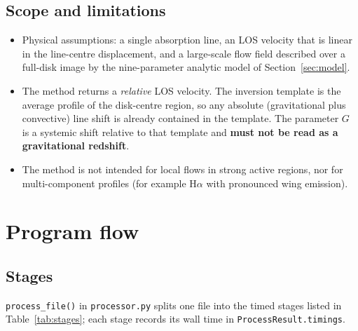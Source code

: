 \documentclass[11pt,a4paper]{article}
\newcommand{\code}[1]{\texttt{\small #1}}
\begin{document}
\subsection{Scope and limitations}
\begin{itemize}
  \item Physical assumptions: a single absorption line, an LOS velocity that is
        linear in the line-centre displacement, and a large-scale flow field
        described over a full-disk image by the nine-parameter analytic model
        of Section~\ref{sec:model}.
  \item The method returns a \emph{relative} LOS velocity.  The inversion
        template is the average profile of the disk-centre region, so any
        absolute (gravitational plus convective) line shift is already contained
        in the template.  The parameter $G$ is a systemic shift relative to that
        template and \textbf{must not be read as a gravitational redshift}.
  \item The method is not intended for local flows in strong active regions, nor
        for multi-component profiles (for example H$\alpha$ with pronounced
        wing emission).
\end{itemize}

\section{Program flow}
\label{sec:flow}

\subsection{Stages}
\code{process\_file()} in \code{processor.py} splits one file into the timed
stages listed in Table~\ref{tab:stages}; each stage records its wall time in
\code{ProcessResult.timings}.
\end{document}
